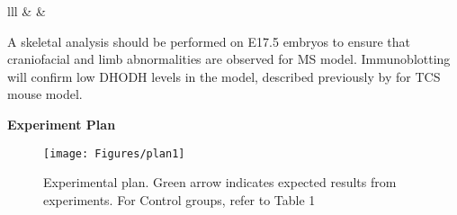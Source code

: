 \documentclass[12pt]{article}
\begin{document}
\begin{table}[!htp]
\begin{tabular}{lll}
		         &                                                                                                                                                                                                                                &  \\ \hline
	\end{tabular}
\end{table}



A skeletal analysis should be performed on E17.5 embryos to ensure that craniofacial and limb abnormalities are observed for MS model. Immunoblotting will confirm low DHODH levels in the model, described previously by \cite{sakai2016prevention} for TCS mouse model.                                                                                                                              



\textbf{Experiment Plan}


	\begin{figure}[!htp]
		\centering
	\texttt{[image: Figures/plan1]}
	\caption{Experimental plan. Green arrow indicates expected results from experiments. For Control groups, refer to Table 1}
	\label{fig:plan2}
	\end{figure}
	
\pagebreak







\end{document}
